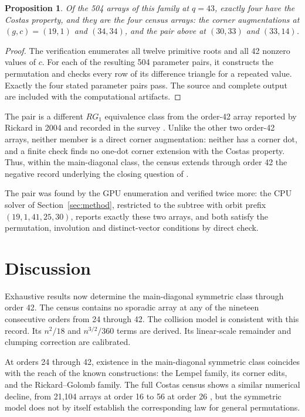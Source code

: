\documentclass[11pt]{article}
\newtheorem{proposition}{Proposition}
\begin{document}
\begin{proposition}
\label{prop:family}
Of the 504 arrays of this family at $q=43$, exactly four have the Costas
property, and they are the four census arrays: the corner augmentations
at $(g,c)=(19,1)$ and $(34,34)$, and the pair above at $(30,33)$ and
$(33,14)$.
\end{proposition}

\begin{proof}
The verification enumerates all twelve primitive roots and all 42 nonzero
values of $c$.  For each of the resulting 504 parameter pairs, it
constructs the permutation and checks every row of its difference
triangle for a repeated value.  Exactly the four stated parameter pairs
pass.  The source and complete output are included with the computational
artifacts.
\end{proof}

The pair is a different $RG_{1}$ equivalence class from the order-42 array
reported by Rickard in 2004 and recorded in the survey
\cite{Rickard2004Periodicity,Drakakis2011OpenProblems}.  Unlike the other
two order-42 arrays,
neither member is a direct corner augmentation: neither has a corner dot,
and a finite check finds no one-dot corner extension with the Costas
property.  Thus, within the main-diagonal class, the census extends through
order 42 the negative record underlying the closing question of
\cite{RickardDrakakis2009Symmetry}.

The pair was found by the GPU enumeration and verified twice more:
the CPU solver of Section~\ref{sec:method}, restricted to the subtree
with orbit prefix $(19,1,41,25,30)$, reports exactly these two arrays,
and both satisfy the permutation, involution and distinct-vector
conditions by direct check.

\section{Discussion}
\label{sec:discussion}

Exhaustive results now determine the main-diagonal symmetric class
through order 42.  The census contains no sporadic array at any of the
nineteen consecutive orders from 24 through 42.  The collision model is
consistent with this record.  Its $n^2/18$ and $n^{3/2}/360$ terms are
derived.  Its linear-scale remainder and clumping correction are calibrated.

At orders 24 through 42, existence in the main-diagonal symmetric class
coincides with the reach of the known constructions: the Lempel family,
its corner edits, and the Rickard--Golomb family.  The full Costas census
shows a similar numerical decline, from 21{,}104 arrays at order 16 to 56
at order 26 \cite{DrakakisIorioRickardWalsh2011Order29}, but the symmetric
model does not by itself establish the corresponding law for general
permutations.
\end{document}
